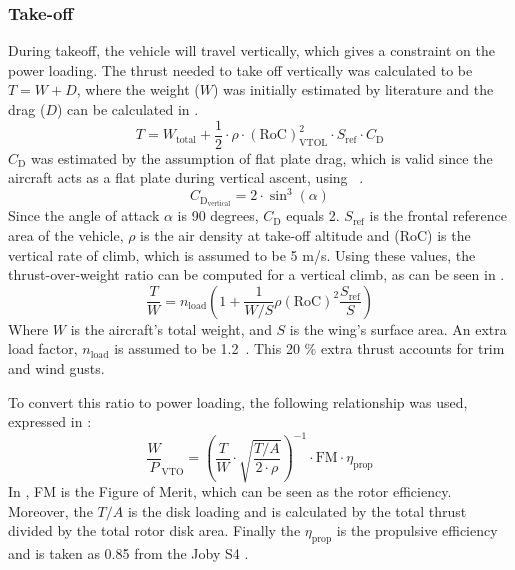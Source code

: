 \subsubsection{Take-off}
During takeoff, the vehicle will travel vertically, which gives a constraint on the power loading.
The thrust needed to take off vertically was calculated to be $   T = W + D$, where the weight ($W$) was initially estimated by literature and the drag ($D$) can be calculated in .
\begin{equation}
    \label{eq:vertical thrust}
    T = W_{\text{total}} +\frac{1}{2}\cdot\rho\cdot(\text{RoC})^2_{\text{VTOL}}\cdot S_{\text{ref}}\cdot C_{\text{D}}
\end{equation}
$C_{\text{D}}$ was estimated by the assumption of flat plate drag, which is valid since the aircraft acts as a flat plate during vertical ascent, using ~\cite{prelimSizingLoadingdiagram}.
\begin{equation}
    \label{eq:Cdvertical}
    C_{\text{D}_{\text{vertical}}} = 2\cdot \sin^3(\alpha)
\end{equation}
 Since the angle of attack $\alpha$ is 90 degrees, $C_{\text{D}}$ equals 2. $S_{\text{ref}}$ is the frontal reference area of the vehicle, $\rho$ is the air density at take-off altitude and (RoC) is the vertical rate of climb, which is assumed to be 5 m/s.
Using these values, the thrust-over-weight ratio can be computed for a vertical climb, as can be seen in .
\begin{equation}
    \label{eq:T//2 vertical climb}
    \frac{T}{W} = n_{\text{load}}\left(1+ \frac{1}{W/S}\rho (\text{RoC})^2 \frac{S_{\text{ref}}}{S}\right)
\end{equation}
Where $W$ is the aircraft's total weight, and $S$ is the wing's surface area.
 An extra load factor, $n_{\text{load}}$ is assumed to be 1.2~\cite{prelimSizingLoadingdiagram}.
This 20 $\%$ extra thrust accounts for trim and wind gusts.

To convert this ratio to power loading, the following relationship was used, expressed in :
\begin{equation}
    \label{eq:powerloadingvtol}
    \frac{W}{P}_{\text{VTO}} = \left(\frac{T}{W}\cdot \sqrt{\frac{T/A}{2\cdot \rho}}\right)^{-1} \cdot \text{FM} \cdot\eta_{\text{prop}}
\end{equation}
In , FM is the Figure of Merit, which can be seen as the rotor efficiency.
Moreover, the $T/A$ is the disk loading and is calculated by the total thrust divided by the total rotor disk area. Finally the $\eta_{\text{prop}}$ is the propulsive efficiency and is taken as 0.85 from the Joby S4 \cite{moller2020performance}.

